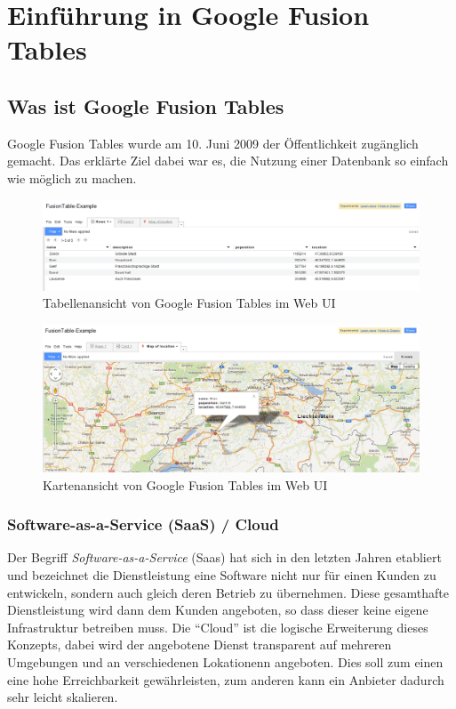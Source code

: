 \chapter{Einführung in Google Fusion Tables}

\section{Was ist Google Fusion Tables}
Google Fusion Tables wurde am 10. Juni 2009 der Öffentlichkeit zugänglich gemacht\cite{fusion-table-announce}. Das erklärte Ziel dabei war es, die Nutzung einer Datenbank so einfach wie möglich zu machen.

\begin{figure}[h]
	\centering
	\includegraphics[width=450px]{images/einfuehrung/gft-webgui-table}
	\caption{Tabellenansicht von Google Fusion Tables im Web UI}
	\label{gft-webgui-table}
\end{figure}

\begin{figure}[h]
	\centering
	\includegraphics[width=450px]{images/einfuehrung/gft-webgui-map}
	\caption{Kartenansicht von Google Fusion Tables im Web UI}
	\label{gft-webgui-map}
\end{figure}

\subsection{Software-as-a-Service (SaaS) / Cloud}
Der Begriff \emph{Software-as-a-Service} (Saas) hat sich in den letzten Jahren etabliert und bezeichnet die Dienstleistung eine Software nicht nur für einen Kunden zu entwickeln, sondern auch gleich deren Betrieb zu übernehmen. Diese gesamthafte Dienstleistung wird dann dem Kunden angeboten, so dass dieser keine eigene Infrastruktur betreiben muss. Die "`Cloud"' ist die logische  Erweiterung dieses Konzepts, dabei wird der angebotene Dienst transparent auf mehreren Umgebungen und an verschiedenen Lokationenn angeboten. Dies soll zum einen eine hohe Erreichbarkeit gewährleisten, zum anderen kann ein Anbieter dadurch sehr leicht skalieren. 


